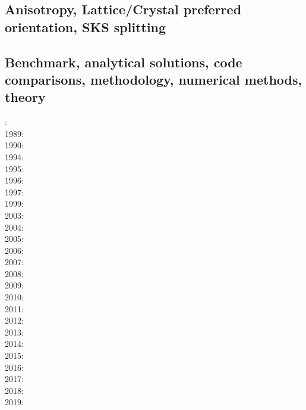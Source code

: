 \subsection{Anisotropy, Lattice/Crystal preferred orientation, SKS splitting}

\cite{faca13}
\cite{facc14}

\subsection*{Benchmark, analytical solutions, code comparisons, methodology, numerical methods, theory}

: \cite{yusa84}\\
1989: \cite{blbc89}\\
1990: \cite{trab90}\\
1994: \cite{brsa94}\\
1995: \cite{brsa95}\cite{moso95}\cite{full95}\\
1996: \cite{zhon96}\cite{mozg96}\\
1997: \cite{rist97}\\
1999: \cite{lind99}\\
2003: \cite{taki03}\cite{modm03}\cite{geyu03}\\
2004: \cite{kaps04}\cite{kasa04}\cite{kaks08}\\
2005: \cite{mure05}\\
2006: \cite{kapo06}\cite{more06}\\
2007: \cite{toma07}\cite{chcc07}\cite{kabe07}\cite{kaks07}\cite{moql07}\cite{geyu07}\\
2008: \cite{zhmt08}\cite{deka08}\cite{trub08}\cite{krdp08}\cite{mamo08}\cite{gepd98}\cite{vack08}\\
2009: \cite{king09}\cite{geum09}\\
2010: \cite{kaus10}\cite{kamm10}\cite{egat10}\cite{kilv10}\\
2011: \cite{dumg11}\cite{uibb11}\cite{hegc11}\\
2012: \cite{crsg12}\cite{chgv12}\cite{krwd12}\cite{may12}\cite{gerb12}\\
2013: \cite{chtl13}\cite{kemk13}\cite{gemd13}\\
2014: \cite{thmk14}\cite{mabl14}\\
2015: \cite{lelk15}\cite{rumi15}\cite{chpe15}\cite{mabl15}\\
2016: \cite{dumy16}\cite{blmp16}\\
2017: \cite{robh17}\cite{wisv17}\\
2018: \cite{memm18}\\
2019: \cite{clhe19}\cite{liki19}

